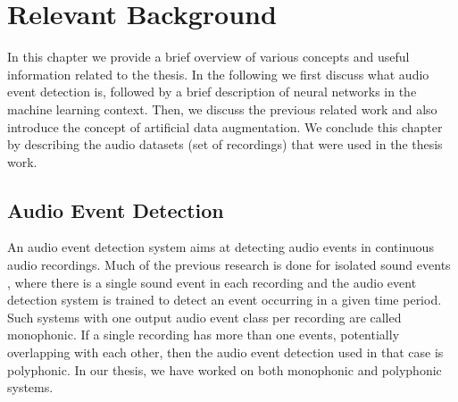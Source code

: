 \chapter{Relevant Background}
In this chapter we provide a brief overview of various concepts and useful information related to the thesis. In the following we first discuss what audio event detection is, followed by a brief description of neural networks in the machine learning context. Then, we discuss the previous related work and also introduce the concept of artificial data augmentation. We conclude this chapter by describing the audio datasets (set of recordings) that were used in the thesis work.

\section{Audio Event Detection}
An audio event detection system aims at detecting audio events in continuous audio recordings. Much of the previous research is done for isolated sound events \cite{gencoglu2014recognition}, where there is a single sound event in each recording and the audio event detection system is trained to detect an event occurring in a given time period. Such systems with one output audio event class per recording are called monophonic. If a single recording has more than one events, potentially overlapping with each other, then the audio event detection used in that case is polyphonic. In our thesis, we have worked on both monophonic and polyphonic systems. 

